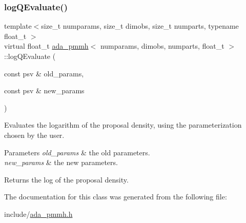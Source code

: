 \subsubsection{\texorpdfstring{log\+Q\+Evaluate()}{logQEvaluate()}}
{\footnotesize\ttfamily template$<$size\+\_\+t numparams, size\+\_\+t dimobs, size\+\_\+t numparts, typename float\+\_\+t $>$ \\
virtual float\+\_\+t \hyperlink{classada__pmmh}{ada\+\_\+pmmh}$<$ numparams, dimobs, numparts, float\+\_\+t $>$\+::log\+Q\+Evaluate (\begin{DoxyParamCaption}\item[{const psv \&}]{old\+\_\+params,  }\item[{const psv \&}]{new\+\_\+params }\end{DoxyParamCaption})\hspace{0.3cm}{\ttfamily [pure virtual]}}



Evaluates the logarithm of the proposal density, using the parameterization chosen by the user. 


\begin{DoxyParams}{Parameters}
{\em old\+\_\+params} & the old parameters. \\
\hline
{\em new\+\_\+params} & the new parameters. \\
\hline
\end{DoxyParams}
\begin{DoxyReturn}{Returns}
the log of the proposal density. 
\end{DoxyReturn}


The documentation for this class was generated from the following file\+:\begin{DoxyCompactItemize}
\item 
include/\hyperlink{ada__pmmh_8h}{ada\+\_\+pmmh.\+h}\end{DoxyCompactItemize}
